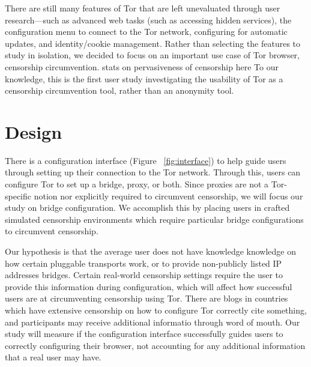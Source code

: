 \documentclass{template}
\begin{document}
There are still many features of Tor that are left unevaluated through user research---such as advanced web tasks (such as accessing hidden services), the configuration menu to connect to the Tor network, configuring for automatic updates, and identity/cookie management. Rather than selecting the features to study in isolation, 
we decided to focus on an important use case of Tor browser, censorship circumvention. 
{\color {red} stats on pervasiveness of censorship here}
To our knowledge, this is the first user study investigating the usability of Tor as a 
censorship circumvention tool, rather than an anonymity tool.

\section{Design}

There is a configuration interface (Figure ~\ref{fig:interface}) to help guide users through 
setting up their connection to the Tor network. Through this, users can configure Tor to set up a bridge,
proxy, or both. Since proxies are not a Tor-specific notion nor explicitly required to circumvent censorship, 
we will focus our study on bridge configuration. We accomplish this by placing users in crafted simulated 
censorship environments which require particular bridge configurations to circumvent censorship. 

Our hypothesis is that the average user does not have knowledge
knowledge on how certain pluggable transports work, or to provide non-publicly listed IP
addresses bridges. Certain real-world censorship settings require the user to provide this
information during configuration, which will affect how successful users are at 
circumventing censorship using Tor. There are blogs in countries which have extensive
censorship on how to configure Tor correctly {\color {red} cite something}, and participants may 
receive additional informatio through word of mouth. Our study will measure if the configuration
interface successfully guides users to correctly configuring their browser, not accounting 
for any additional  information that a real user may have.\\
\end{document}

